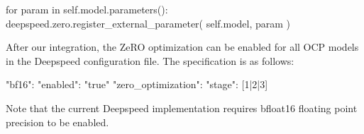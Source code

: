 \begin{python}
for param in self.model.parameters():
    deepspeed.zero.register_external_parameter(
        self.model, param
    )
\end{python}




After our integration, the ZeRO optimization can be enabled for all OCP models in the Deepspeed configuration 
file. The specification is as follows:

\begin{json}
{
    "bf16": {
        "enabled": "true"
    }
    "zero_optimization": {
        "stage": [1|2|3]
    }
}
\end{json}

Note that the current Deepspeed implementation requires bfloat16 floating point precision to be enabled. 
